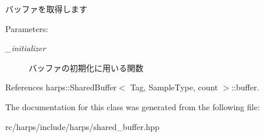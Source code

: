 バッファを取得します \begin{Desc}
\item[Parameters:]
\begin{description}
\item[{\em \_\-initializer}]バッファの初期化に用いる関数 \end{description}
\end{Desc}


References harps::SharedBuffer$<$ Tag, SampleType, count $>$::buffer.

The documentation for this class was generated from the following file:\begin{CompactItemize}
\item 
rc/harps/include/harps/shared\_\-buffer.hpp\end{CompactItemize}

